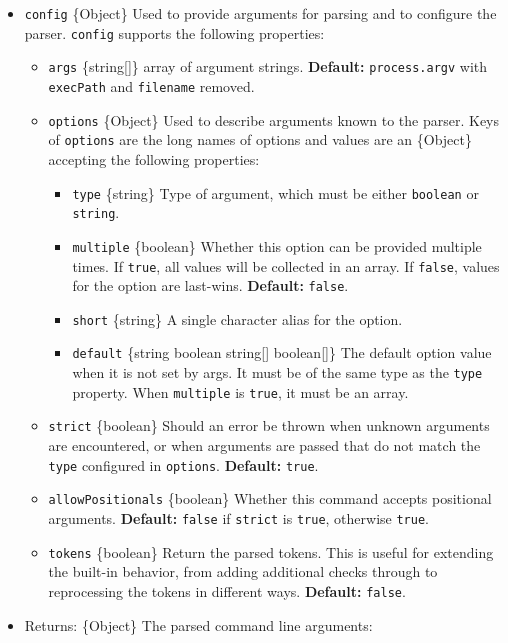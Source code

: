 \begin{itemize}
\tightlist
\item
  \texttt{config} \{Object\} Used to provide arguments for parsing and
  to configure the parser. \texttt{config} supports the following
  properties:

  \begin{itemize}
  \tightlist
  \item
    \texttt{args} \{string{[}{]}\} array of argument strings.
    \textbf{Default:} \texttt{process.argv} with \texttt{execPath} and
    \texttt{filename} removed.
  \item
    \texttt{options} \{Object\} Used to describe arguments known to the
    parser. Keys of \texttt{options} are the long names of options and
    values are an \{Object\} accepting the following properties:

    \begin{itemize}
    \tightlist
    \item
      \texttt{type} \{string\} Type of argument, which must be either
      \texttt{boolean} or \texttt{string}.
    \item
      \texttt{multiple} \{boolean\} Whether this option can be provided
      multiple times. If \texttt{true}, all values will be collected in
      an array. If \texttt{false}, values for the option are last-wins.
      \textbf{Default:} \texttt{false}.
    \item
      \texttt{short} \{string\} A single character alias for the option.
    \item
      \texttt{default} \{string \textbar{} boolean \textbar{}
      string{[}{]} \textbar{} boolean{[}{]}\} The default option value
      when it is not set by args. It must be of the same type as the
      \texttt{type} property. When \texttt{multiple} is \texttt{true},
      it must be an array.
    \end{itemize}
  \item
    \texttt{strict} \{boolean\} Should an error be thrown when unknown
    arguments are encountered, or when arguments are passed that do not
    match the \texttt{type} configured in \texttt{options}.
    \textbf{Default:} \texttt{true}.
  \item
    \texttt{allowPositionals} \{boolean\} Whether this command accepts
    positional arguments. \textbf{Default:} \texttt{false} if
    \texttt{strict} is \texttt{true}, otherwise \texttt{true}.
  \item
    \texttt{tokens} \{boolean\} Return the parsed tokens. This is useful
    for extending the built-in behavior, from adding additional checks
    through to reprocessing the tokens in different ways.
    \textbf{Default:} \texttt{false}.
  \end{itemize}
\item
  Returns: \{Object\} The parsed command line arguments:


\end{itemize}
